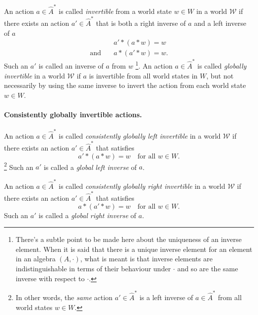 An action $a \in \hat{A}^{*}$ is called \emph{invertible} from a world state $w \in W$ in a world $\mathscr{W}$ if there exists an action $a' \in \hat{A}^{*}$ that is both a right inverse of $a$ and a left inverse of $a$
\begin{equation}
\begin{aligned}
    & a' \ast (a \ast w) = w \\
    \text{and} \quad & a \ast (a' \ast w) = w.
\end{aligned}
\end{equation}
Such an $a'$ is called an inverse of $a$ from $w$
\footnote{
There's a subtle point to be made here about the uniqueness of an inverse element.
When it is said that there is a unique inverse element for an element in an algebra $(A, \cdot)$, what is meant is that inverse elements are indistinguishable in terms of their behaviour under $\cdot$ and so are the same inverse with respect to $\cdot$.
}.
An action $a \in \hat{A}^{*}$ is called \emph{globally invertible} in a world $\mathscr{W}$ if $a$ is invertible from all world states in $W$, but not necessarily by using the same inverse to invert the action from each world state $w \in W$.

\paragraph{Consistently globally invertible actions.}
An action $a \in \hat{A}^{*}$ is called \emph{consistently globally left invertible} in a world $\mathscr{W}$ if there exists an action $a' \in \hat{A}^{*}$ that satisfies
\begin{equation}\label{eqn:global_left_inverse_def}
    a' \ast (a \ast w) = w \quad \text{for all $w \in W$}.
\end{equation}
\footnote{
In other words, the \emph{same} action $a' \in \hat{A}^{*}$ is a left inverse of $a \in \hat{A}^{*}$ from all world states $w \in W$.
}
Such an $a'$ is called a \emph{global left inverse} of $a$.

An action $a \in \hat{A}^{*}$ is called \emph{consistently globally right invertible} in a world $\mathscr{W}$ if there exists an action $a' \in \hat{A}^{*}$ that satisfies
\begin{equation}\label{eqn:global_right_inverse_def}
    a \ast (a' \ast w) = w \quad \text{for all $w \in W$}.
\end{equation}
Such an $a'$ is called a \emph{global right inverse} of $a$.


